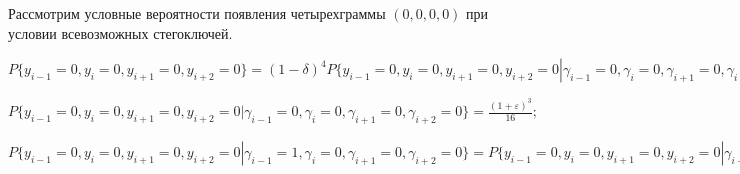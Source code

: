 ﻿\documentclass[a4paper,12pt]{article}
\theoremstyle{plain}
\begin{document}
Рассмотрим  условные вероятности появления четырехграммы $(0,0,0,0)$ при условии всевозможных стегоключей.

$P\{y_{i-1} = 0, y_i = 0, y_{i+1} = 0, y_{i+2} = 0\} =  (1-\delta)^4P\{y_{i-1} = 0, y_i = 0, y_{i+1} = 0, y_{i+2} = 0 |\gamma_{i-1}=0,\gamma_i=0,\gamma_{i+1}=0, \gamma_{i+2} = 0\} + 
\delta(1-\delta)^3\biggr(P\{y_{i-1} = 0, y_i = 0, y_{i+1} = 0, y_{i+2} = 0 |\gamma_{i-1}=0,\gamma_i=0,\gamma_{i+1}=0, \gamma_{i+2} = 1\} +
P\{y_{i-1} = 0, y_i = 0, y_{i+1} = 0, y_{i+2} = 0 |\gamma_{i-1}=0,\gamma_i=0,\gamma_{i+1}=1, \gamma_{i+2} = 0\} +
P\{y_{i-1} = 0, y_i = 0, y_{i+1} = 0, y_{i+2} = 0 |\gamma_{i-1}=0,\gamma_i=1,\gamma_{i+1}=0, \gamma_{i+2} = 0\} +
P\{y_{i-1} = 0, y_i = 0, y_{i+1} = 0, y_{i+2} = 0 |\gamma_{i-1}=1,\gamma_i=0,\gamma_{i+1}=0, \gamma_{i+2} = 0\}\biggr) +
\delta^2(1-\delta)^2 \biggr(P\{y_{i-1} = 0, y_i = 0, y_{i+1} = 0, y_{i+2} = 0 |\gamma_{i-1}=0,\gamma_i=0,\gamma_{i+1}=1, \gamma_{i+2} = 1\} +
P\{y_{i-1} = 0, y_i = 0, y_{i+1} = 0, y_{i+2} = 0 |\gamma_{i-1}=0,\gamma_i=1,\gamma_{i+1}=1, \gamma_{i+2} = 0\} +
P\{y_{i-1} = 0, y_i = 0, y_{i+1} = 0, y_{i+2} = 0 |\gamma_{i-1}=1,\gamma_i=1,\gamma_{i+1}=0, \gamma_{i+2} = 0\} +
P\{y_{i-1} = 0, y_i = 0, y_{i+1} = 0, y_{i+2} = 0 |\gamma_{i-1}=1,\gamma_i=0,\gamma_{i+1}=1, \gamma_{i+2} = 0\}+
P\{y_{i-1} = 0, y_i = 0, y_{i+1} = 0, y_{i+2} = 0 |\gamma_{i-1}=0,\gamma_i=1,\gamma_{i+1}=0, \gamma_{i+2} = 1\}+
P\{y_{i-1} = 0, y_i = 0, y_{i+1} = 0, y_{i+2} = 0 |\gamma_{i-1}=1,\gamma_i=0,\gamma_{i+1}=0, \gamma_{i+2} = 1\}\biggr)
+\delta^3(1-\delta) \biggr(P\{y_{i-1} = 0, y_i = 0, y_{i+1} = 0, y_{i+2} = 0 |\gamma_{i-1}=0,\gamma_i=1,\gamma_{i+1}=1, \gamma_{i+2} = 1\} +
P\{y_{i-1} = 0, y_i = 0, y_{i+1} = 0, y_{i+2} = 0 |\gamma_{i-1}=1,\gamma_i=0,\gamma_{i+1}=1, \gamma_{i+2} = 1\} +
P\{y_{i-1} = 0, y_i = 0, y_{i+1} = 0, y_{i+2} = 0 |\gamma_{i-1}=1,\gamma_i=1,\gamma_{i+1}=0, \gamma_{i+2} = 1\} +
P\{y_{i-1} = 0, y_i = 0, y_{i+1} = 0, y_{i+2} = 0 |\gamma_{i-1}=1,\gamma_i=1,\gamma_{i+1}=1, \gamma_{i+2} = 0\}\biggr)
+ \delta^4 (	P\{y_{i-1} = 0, y_i = 0, y_{i+1} = 0, y_{i+2} = 0 |\gamma_{i-1}=1,\gamma_i=1,\gamma_{i+1}=1, \gamma_{i+2} = 1\}).$\newline

$P\{y_{i-1} = 0, y_i = 0, y_{i+1} = 0, y_{i+2} = 0 |\gamma_{i-1}=0,\gamma_i=0,\gamma_{i+1}=0, \gamma_{i+2} = 0\}=\frac{(1+\varepsilon)^3}{16};$\newline

$P\{y_{i-1} = 0, y_i = 0, y_{i+1} = 0, y_{i+2} = 0 |\gamma_{i-1}=1,\gamma_i=0,\gamma_{i+1}=0, \gamma_{i+2} = 0\}=P\{y_{i-1} = 0, y_i = 0, y_{i+1} = 0, y_{i+2} = 0 |\gamma_{i-1}=0,\gamma_i=0,\gamma_{i+1}=0, \gamma_{i+2} = 1\}=\frac{(1+\varepsilon)^2}{16};$\newline
\end{document}
